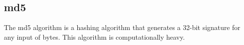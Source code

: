 \subsection{md5}
The md5 algorithm is a hashing algorithm that generates a 32-bit signature for any input of bytes. This algorithm is computationally heavy.
